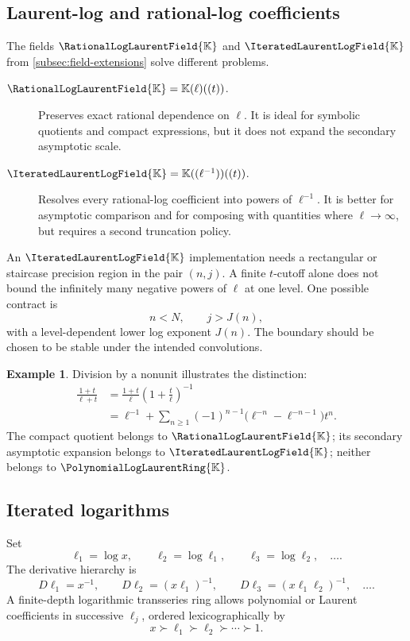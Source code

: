 \documentclass[11pt,oneside]{article}
\numberwithin{equation}{section}
\theoremstyle{definition}
\newtheorem{example}[theorem]{Example}
\newcommand{\K}{\mathbb{K}}
\newcommand{\PL}{\PolynomialLogLaurentRing{\K}}
\newcommand{\RL}{\RationalLogLaurentField{\K}}
\newcommand{\HL}{\IteratedLaurentLogField{\K}}
\begin{document}
\subsection{Laurent-log and rational-log coefficients}

The fields \(\RL\) and \(\HL\) from
\cref{subsec:field-extensions} solve different problems.
\begin{description}
\item[\(\RL=\K(\ell)((t))\).]
Preserves exact rational dependence on \(\ell\).  It is ideal for symbolic
quotients and compact expressions, but it does not expand the secondary
asymptotic scale.
\item[\(\HL=\K((\ell^{-1}))((t))\).]
Resolves every rational-log coefficient into powers of \(\ell^{-1}\).  It is
better for asymptotic comparison and for composing with quantities where
\(\ell\to\infty\), but requires a second truncation policy.
\end{description}

An \(\HL\) implementation needs a rectangular or staircase precision region in
the pair \((n,j)\).  A finite \(t\)-cutoff alone does not bound the infinitely
many negative powers of \(\ell\) at one level.  One possible contract is
\[
  n<N,
  \qquad j>J(n),
\]
with a level-dependent lower log exponent \(J(n)\).  The boundary should be
chosen to be stable under the intended convolutions.

\begin{example}
Division by a nonunit illustrates the distinction:
\begin{align}
 \frac{1+t}{\ell+t}
 &=\frac{1+t}{\ell}\left(1+\frac{t}{\ell}\right)^{-1}\nonumber\\
 &=\ell^{-1}
 +\sum_{n\ge1}(-1)^{n-1}
   \bigl(\ell^{-n}-\ell^{-n-1}\bigr)t^n.
 \label{eq:nonunit-division-example}
\end{align}
The compact quotient belongs to \(\RL\); its secondary asymptotic expansion
belongs to \(\HL\); neither belongs to \(\PL\).
\end{example}

\subsection{Iterated logarithms}

Set
\[
  \ell_1=\log x,
  \qquad \ell_2=\log\ell_1,
  \qquad \ell_3=\log\ell_2,
  \quad\ldots.
\]
The derivative hierarchy is
\begin{equation}\label{eq:iterated-log-derivatives}
  D\ell_1=x^{-1},
  \qquad
  D\ell_2=(x\ell_1)^{-1},
  \qquad
  D\ell_3=(x\ell_1\ell_2)^{-1},
  \quad\ldots.
\end{equation}
A finite-depth logarithmic transseries ring allows polynomial or Laurent
coefficients in successive \(\ell_j\), ordered lexicographically by
\[
  x\succ\ell_1\succ\ell_2\succ\cdots\succ1.
\]
\end{document}
